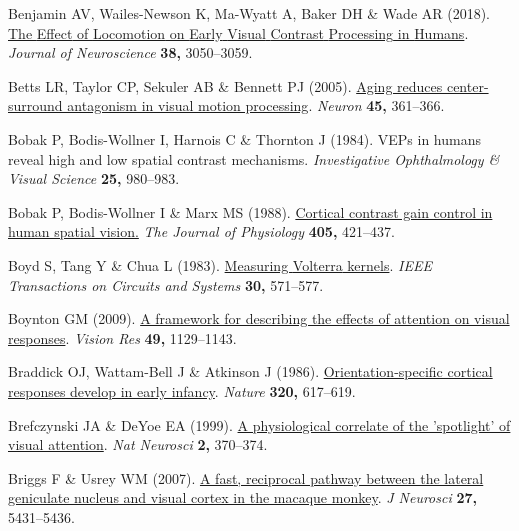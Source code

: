 \documentclass[
  letterpaper,
  DIV=11,
  numbers=noendperiod]{scrartcl}
\newlength{\cslhangindent}
\newenvironment{CSLReferences}[2] %
 {\begin{list}{}{%
  \setlength{\itemindent}{0pt}
  \setlength{\leftmargin}{0pt}
  \setlength{\parsep}{0pt}
  \ifodd #1
   \setlength{\leftmargin}{\cslhangindent}
   \setlength{\itemindent}{-1\cslhangindent}
  \fi
  \setlength{\itemsep}{#2\baselineskip}}}
 {\end{list}}
\begin{document}
\begin{CSLReferences}{1}{1}
Benjamin AV, Wailes-Newson K, Ma-Wyatt A, Baker DH \& Wade AR (2018).
\href{https://doi.org/10.1523/JNEUROSCI.1428-17.2017}{The {Effect} of
{Locomotion} on {Early} {Visual} {Contrast} {Processing} in {Humans}}.
\emph{Journal of Neuroscience} \textbf{38,} 3050--3059.

Betts LR, Taylor CP, Sekuler AB \& Bennett PJ (2005).
\href{https://doi.org/10.1016/j.neuron.2004.12.041}{Aging reduces
center-surround antagonism in visual motion processing}. \emph{Neuron}
\textbf{45,} 361--366.

Bobak P, Bodis-Wollner I, Harnois C \& Thornton J (1984). VEPs in humans
reveal high and low spatial contrast mechanisms. \emph{Investigative
Ophthalmology \& Visual Science} \textbf{25,} 980--983.

Bobak P, Bodis-Wollner I \& Marx MS (1988).
\href{https://doi.org/10.1113/jphysiol.1988.sp017340}{Cortical contrast
gain control in human spatial vision.} \emph{The Journal of Physiology}
\textbf{405,} 421--437.

Boyd S, Tang Y \& Chua L (1983).
\href{https://doi.org/10.1109/TCS.1983.1085391}{Measuring {Volterra}
kernels}. \emph{IEEE Transactions on Circuits and Systems} \textbf{30,}
571--577.

Boynton GM (2009). \href{https://doi.org/10.1016/j.visres.2008.11.001}{A
framework for describing the effects of attention on visual responses}.
\emph{Vision Res} \textbf{49,} 1129--1143.

Braddick OJ, Wattam-Bell J \& Atkinson J (1986).
\href{https://doi.org/10.1038/320617a0}{Orientation-specific cortical
responses develop in early infancy}. \emph{Nature} \textbf{320,}
617--619.

Brefczynski JA \& DeYoe EA (1999). \href{https://doi.org/10.1038/7280}{A
physiological correlate of the 'spotlight' of visual attention}.
\emph{Nat Neurosci} \textbf{2,} 370--374.

Briggs F \& Usrey WM (2007).
\href{https://doi.org/10.1523/JNEUROSCI.1035-07.2007}{A fast, reciprocal
pathway between the lateral geniculate nucleus and visual cortex in the
macaque monkey}. \emph{J Neurosci} \textbf{27,} 5431--5436.


\end{CSLReferences}
\end{document}
